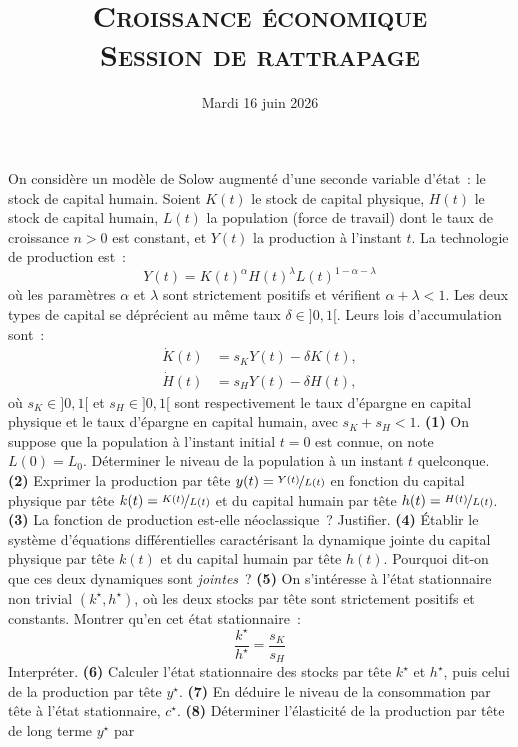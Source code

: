 \documentclass[11pt,a4paper,notitlepage,twocolumn]{article}
\begin{document}
\title{\textsc{Croissance économique\\ \small{Session de rattrapage}}}
\date{Mardi 16 juin 2026}

\maketitle
\thispagestyle{empty}

On considère un modèle de Solow augmenté d'une seconde variable
d'état~: le stock de capital humain. Soient $K(t)$ le stock de capital
physique, $H(t)$ le stock de capital humain, $L(t)$ la population
(force de travail) dont le taux de croissance $n>0$ est constant, et
$Y(t)$ la production à l'instant $t$. La technologie de production
est~:
\[
Y(t) = K(t)^{\alpha}H(t)^{\lambda}L(t)^{1-\alpha-\lambda}
\]
où les paramètres $\alpha$ et $\lambda$ sont strictement positifs et
vérifient $\alpha+\lambda<1$. Les deux types de capital se déprécient
au même taux $\delta\in]0,1[$. Leurs lois d'accumulation sont~:
\[
\begin{aligned}
\dot K(t) &= s_K Y(t) - \delta K(t),\\
\dot H(t) &= s_H Y(t) - \delta H(t),
\end{aligned}
\]
où $s_K\in]0,1[$ et $s_H\in]0,1[$ sont respectivement le taux
d'épargne en capital physique et le taux d'épargne en capital humain,
avec $s_K+s_H<1$. \textbf{(1)} On suppose que la population à
l'instant initial $t=0$ est connue, on note $L(0)=L_0$. Déterminer le
niveau de la population à un instant $t$ quelconque. \textbf{(2)}
Exprimer la production par tête $y(t)=\nicefrac{Y(t)}{L(t)}$ en
fonction du capital physique par tête $k(t)=\nicefrac{K(t)}{L(t)}$ et
du capital humain par tête $h(t)=\nicefrac{H(t)}{L(t)}$. \textbf{(3)}
La fonction de production est-elle néoclassique~? Justifier.
\textbf{(4)} Établir le système d'équations différentielles
caractérisant la dynamique jointe du capital physique par tête $k(t)$
et du capital humain par tête $h(t)$. Pourquoi dit-on que ces deux
dynamiques sont \emph{jointes}~? \textbf{(5)} On s'intéresse à l'état
stationnaire non trivial $(k^{\star},h^{\star})$, où les deux stocks
par tête sont strictement positifs et constants. Montrer qu'en cet
état stationnaire~:
\[
\frac{k^{\star}}{h^{\star}} = \frac{s_K}{s_H}
\]
Interpréter. \textbf{(6)} Calculer l'état stationnaire des stocks par
tête $k^{\star}$ et $h^{\star}$, puis celui de la production par tête
$y^{\star}$. \textbf{(7)} En déduire le niveau de la consommation par
tête à l'état stationnaire, $c^{\star}$. \textbf{(8)} Déterminer
l'élasticité de la production par tête de long terme $y^{\star}$ par
\end{document}
